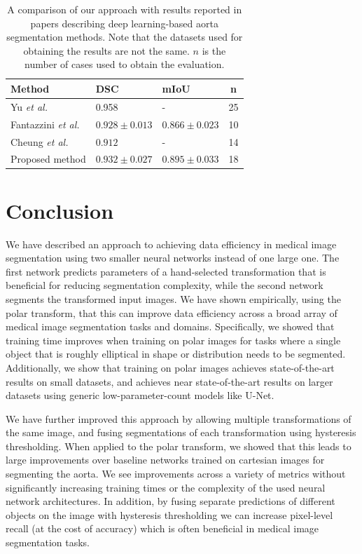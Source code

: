\begin{table}[h]
\def\arraystretch{1.25}
\centering
\begin{tabular}{l l l c}
 \hline
 Method & DSC & mIoU & n\\ 
 \hline
Yu \textit{et al.} \cite{yuThreeDimensionalDeepConvolutional2021} & 0.958 & - & 25 \\
Fantazzini \textit{et al.} \cite{fantazzini3DAutomaticSegmentation2020} & $0.928 \pm 0.013$ & $0.866 \pm 0.023$ & 10 \\
Cheung \textit{et al.} \cite{cheungComputationallyEfficientApproach2021} & $0.912$ & - & 14 \\
Proposed method & $0.932 \pm 0.027$ & $0.895 \pm 0.033$ & 18 \\
\hline
\end{tabular}
\caption{A comparison of our approach with results reported in papers describing deep learning-based aorta segmentation methods. Note that the datasets used for obtaining the results are not the same. $n$ is the number of cases used to obtain the evaluation.}
\label{table:comparison}
\end{table}

\clearpage


  \section{Conclusion}
    
We have described an approach to achieving data efficiency in medical image segmentation using two smaller neural networks instead of one large one. The first network predicts parameters of a hand-selected transformation that is beneficial for reducing segmentation complexity, while the second network segments the transformed input images. We have shown empirically, using the polar transform, that this can improve data efficiency across a broad array of medical image segmentation tasks and domains. Specifically, we showed that training time improves when training on polar images for tasks where a single object 
that is roughly elliptical in shape or distribution needs to be segmented. Additionally, we show that training on polar
images achieves state-of-the-art results on small datasets, and achieves near state-of-the-art results on larger
datasets using generic low-parameter-count models like U-Net.

We have further improved this approach by allowing multiple transformations of the same image, and fusing segmentations of each transformation using hysteresis thresholding. When applied to the polar transform, we showed that this leads to large improvements over baseline networks trained on cartesian images for segmenting the aorta. We see improvements across a variety of metrics without significantly increasing training times or the complexity of the used neural network architectures. In addition, by fusing separate predictions of different objects on the image with hysteresis thresholding we can increase pixel-level recall (at the cost of accuracy) which is often beneficial in medical image segmentation tasks. 

